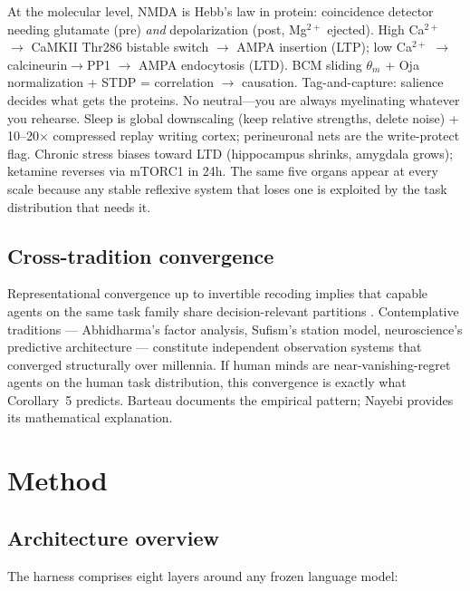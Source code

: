 \documentclass[11pt]{article}
\begin{document}
At the molecular level, NMDA is Hebb's law in protein: coincidence
detector needing glutamate (pre) \emph{and} depolarization (post,
Mg$^{2+}$ ejected). High Ca$^{2+}$ $\to$\allowbreak{} CaMKII Thr286 bistable switch
$\to$\allowbreak{} AMPA insertion (LTP); low Ca$^{2+}$ $\to$\allowbreak{} calcineurin$\to$\allowbreak{}PP1
$\to$\allowbreak{} AMPA endocytosis (LTD). BCM sliding $\theta_m$ + Oja
normalization + STDP = correlation $\to$\allowbreak{} causation. Tag-and-capture:
salience decides what gets the proteins. No neutral---you are always
myelinating whatever you rehearse. Sleep is global downscaling (keep
relative strengths, delete noise) + 10--20$\times$ compressed replay
writing cortex; perineuronal nets are the write-protect flag. Chronic
stress biases toward LTD (hippocampus shrinks, amygdala grows); ketamine
reverses via mTORC1 in 24h. The same five organs appear at every scale
because any stable reflexive system that loses one is exploited by the
task distribution that needs it.

\subsection{Cross-tradition convergence}

Representational convergence up to invertible recoding implies that
capable agents on the same task family share decision-relevant partitions
\citep[Cor.~5]{nayebi2026}. Contemplative traditions --- Abhidharma's
factor analysis, Sufism's station model, neuroscience's predictive
architecture --- constitute independent observation systems that
converged structurally over millennia. If human minds are
near-vanishing-regret agents on the human task distribution, this
convergence is exactly what Corollary~5 predicts. Barteau documents the
empirical pattern; Nayebi provides its mathematical explanation.

\section{Method}\label{sec:method}

\subsection{Architecture overview}

The harness comprises eight layers around any frozen language model:
\end{document}
